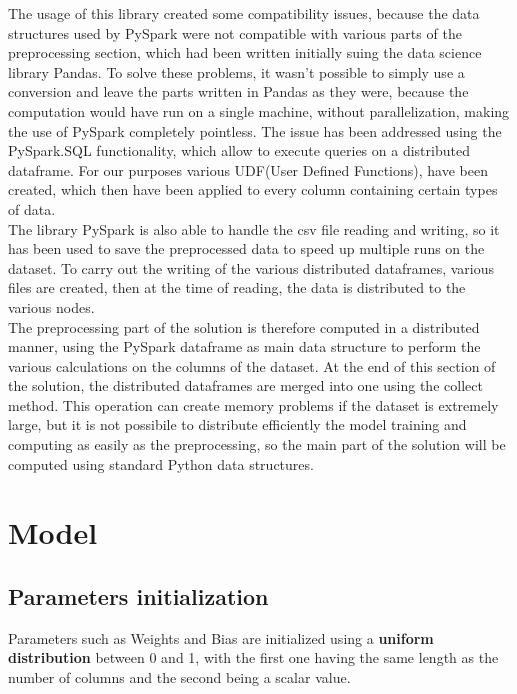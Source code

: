 \documentclass[
	letterpaper, %
	10pt, %
]{class}
\begin{document}
The usage of this library created some compatibility issues, because the data structures used by PySpark were not compatible with various parts of the preprocessing section, which had been written initially suing the data science library Pandas.
To solve these problems, it wasn't possible to simply use a conversion and leave the parts written in Pandas as they were, because the computation would have run on a single machine, without parallelization, making the use of PySpark completely pointless.
The issue has been addressed using the PySpark.SQL functionality, which allow to execute queries on a distributed dataframe. For our purposes various UDF(User Defined Functions), have been created, which then have been applied to every column containing certain types of data.\\

The library PySpark is also able to handle the csv file reading and writing, so it has been used to save the preprocessed data to speed up multiple runs on the dataset. To carry out the writing of the various distributed dataframes, various files are created, then at the time of reading, the data is distributed to the various nodes.\\

The preprocessing part of the solution is therefore computed in a distributed manner, using the PySpark dataframe as main data structure to perform the various calculations on the columns of the dataset.
At the end of this section of the solution, the distributed dataframes are merged into one using the collect method. This operation can create memory problems if the dataset is extremely large, but it is not possibile to distribute efficiently the model training
and computing as easily as the preprocessing, so the main part of the solution will be computed using standard Python data structures.


\section{Model}

\subsection{Parameters initialization}
Parameters such as Weights and Bias are initialized using a \textbf{uniform distribution} between 0 and 1, with the first one having the same length as the number of columns and the second being a scalar value.
\end{document}
